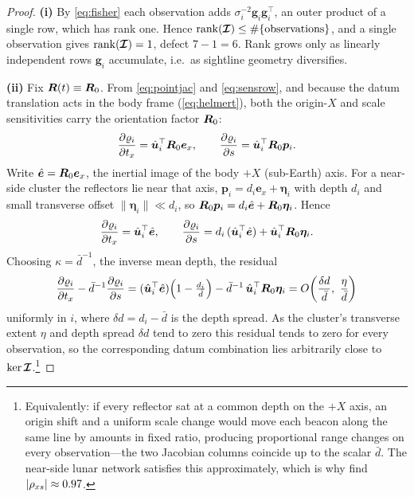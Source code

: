 \begin{proof}
\textbf{(i)} By \eqref{eq:fisher} each observation adds
$\sigma_i^{-2}\bm{g}_i\bm{g}_i^\top$, an outer product of a single row, which has
rank one. Hence $\operatorname{rank}(\bm{\mathcal{I}})\le \#\{\text{observations}\}$, and a
single observation gives $\operatorname{rank}(\bm{\mathcal{I}})=1$, defect $7-1=6$. Rank
grows only as linearly independent rows $\bm{g}_i$ accumulate, i.e.\ as sightline
geometry diversifies.

\textbf{(ii)} Fix $\bm{R}(t)\equiv\bm{R}_0$. From \eqref{eq:pointjac} and
\eqref{eq:sensrow}, and because the datum translation acts in the body frame
(\eqref{eq:helmert}), both the origin-$X$ and scale sensitivities carry the
orientation factor $\bm{R}_0$:
\begin{equation}
  \frac{\partial\varrho_i}{\partial t_x} = \hat{\bm{u}}_i^\top \bm{R}_0\bm{e}_x,
  \qquad
  \frac{\partial\varrho_i}{\partial s} = \hat{\bm{u}}_i^\top \bm{R}_0\bm{p}_i .
  \label{eq:txs}
\end{equation}
Write $\hat{\bm e}=\bm{R}_0\bm{e}_x$, the inertial image of the body $+X$ (sub-Earth)
axis. For a near-side cluster the reflectors lie near that axis,
$\bm{p}_i = d_i\bm{e}_x + \bm\eta_i$ with depth $d_i$ and small transverse offset
$\|\bm\eta_i\|\ll d_i$, so $\bm{R}_0\bm{p}_i = d_i\hat{\bm e} + \bm{R}_0\bm\eta_i$.
Hence
\begin{equation*}
  \frac{\partial\varrho_i}{\partial t_x} = \hat{\bm{u}}_i^\top\hat{\bm e},
  \qquad
  \frac{\partial\varrho_i}{\partial s}
  = d_i\,(\hat{\bm{u}}_i^\top\hat{\bm e}) + \hat{\bm{u}}_i^\top\bm{R}_0\bm\eta_i .
\end{equation*}
Choosing $\kappa=\bar d^{-1}$, the inverse mean depth, the residual
\[
  \frac{\partial\varrho_i}{\partial t_x}-\bar d^{-1}\frac{\partial\varrho_i}{\partial s}
  = (\hat{\bm{u}}_i^\top\hat{\bm e})\Bigl(1-\tfrac{d_i}{\bar d}\Bigr)
    - \bar d^{-1}\,\hat{\bm{u}}_i^\top\bm{R}_0\bm\eta_i
  = O\!\left(\frac{\delta d}{\bar d},\ \frac{\eta}{\bar d}\right)
\]
uniformly in $i$, where $\delta d = d_i-\bar d$ is the depth spread. As the
cluster's transverse extent $\eta$ and depth spread $\delta d$ tend to zero this
residual tends to zero for every observation, so the corresponding datum
combination lies arbitrarily close to
$\ker\bm{\mathcal{I}}$.\footnote{Equivalently: if every reflector sat at a common depth on
the $+X$ axis, an origin shift and a uniform scale change would move each beacon
along the same line by amounts in fixed ratio, producing proportional range
changes on every observation---the two Jacobian columns coincide up to the scalar
$\bar d$. The near-side lunar network satisfies this approximately, which is why
\citet{sosnica2025ilrf} find $|\rho_{x s}|\approx0.97$.}


\end{proof}

